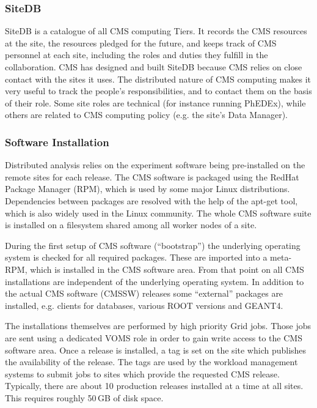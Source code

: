 \subsubsection{ SiteDB }
\label{sec:4_1_2}
SiteDB is a catalogue of all CMS computing Tiers.
It records the CMS resources at the site, the resources pledged for the future,
and keeps track of CMS personnel at each site, including the roles
and duties they fulfill in the collaboration.
CMS has designed and built SiteDB because CMS relies on close contact
with the sites it uses. The distributed nature of CMS computing makes
it very useful to track the people's responsibilities, and to contact
them on the basis of their role. Some site roles are technical
 (for instance running PhEDEx), while others are related to CMS computing
 policy (e.g. the site's Data Manager).

\subsubsection{ Software Installation }
\label{sec:4_1_3}
Distributed analysis relies on the experiment software being
pre-installed on the remote sites for each release. The CMS software
is packaged using the RedHat Package Manager (RPM), which is used by
some major Linux distributions. Dependencies between packages are
resolved with the help of the apt-get tool, which is also widely used in
the Linux community. The whole CMS software suite is installed
on a filesystem shared among all worker nodes of a site.

During the
first setup of CMS software (``bootstrap'') the underlying operating system is
checked for all required packages. These are imported into a meta-RPM,
which is installed in the CMS software area. From that point on all
CMS installations are independent of the underlying operating
system. In addition to the actual CMS software (CMSSW) releases some ``external'' 
packages are installed, e.g. clients for databases, various ROOT
versions and GEANT4.

The installations themselves are performed by high priority Grid
jobs. Those jobs are sent using a dedicated VOMS role %
in order to gain write access to the CMS software area. Once a release is
installed, a tag is set on the 
site which publishes the availability of
the release. The tags are used by the workload management systems to
submit jobs to sites which provide the requested CMS release.
Typically, there are about 10 production releases installed at a time at all
sites. This requires roughly 50\,GB of disk space.

